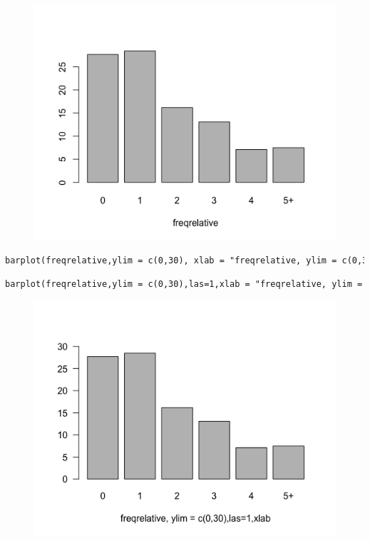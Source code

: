 \begin{figure}[H]\begin{center}\includegraphics[scale=0.45]{ilu/lab2-1.png}\end{center}\end{figure}

\begin{lstlisting}[language=html]
barplot(freqrelative,ylim = c(0,30), xlab = "freqrelative, ylim = c(0,30)")
\end{lstlisting}
 

\begin{lstlisting}[language=html]
barplot(freqrelative,ylim = c(0,30),las=1,xlab = "freqrelative, ylim = c(0,30),las=1,xlab")
\end{lstlisting}
\begin{figure}[H]\begin{center}\includegraphics[scale=0.45]{ilu/lab2-3.png}\end{center}\end{figure}

